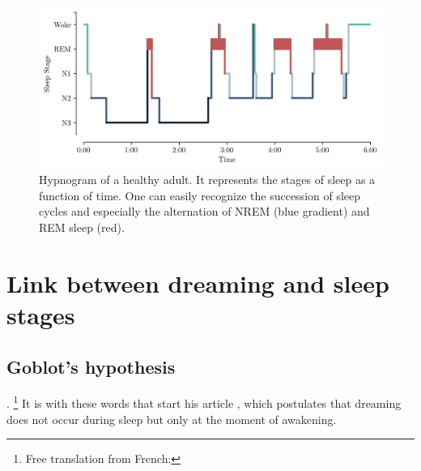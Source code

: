 \vspace{10mm}

\begin{figure}[htb]
	\includegraphics[width=\textwidth]{Fig/Intro/Intro_Hypnogram/Intro_Hypnogram.png}
	\caption[Hypnogram of a healthy adult]{Hypnogram of a healthy adult. It represents the stages of sleep as a function of time. One can easily recognize the succession of sleep cycles and especially the alternation of NREM (blue gradient) and REM sleep (red).}
	\label{fig:intro:hypno}
\end{figure}

%

\section{Link between dreaming and sleep stages}
\label{sec:dream-research:link}

\subsection{Goblot's hypothesis}
\label{sec:dream-research:link:goblot}

. \footnote{Free translation from French: } It is with these words that \citet{goblot_souvenir_1896} start his article , which postulates that dreaming does not occur during sleep but only at the moment of awakening.

